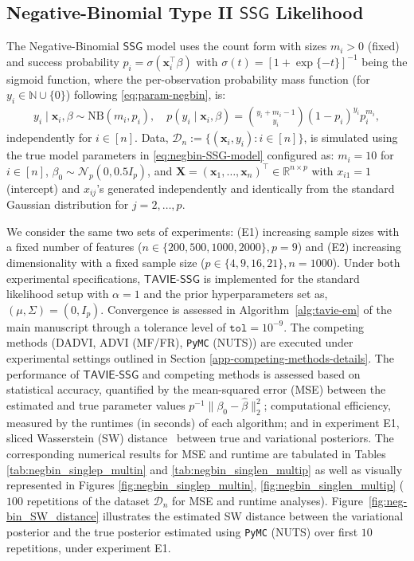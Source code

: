 \documentclass[12pt]{article}
\numberwithin{equation}{section}
\newcommand{\tssg}{\mathsf{TAVIE}\text{-}\mathsf{SSG}}
\begin{document}
\newpage

\subsection{Negative-Binomial Type II \texorpdfstring{$\mathsf{SSG}$}{SSG} Likelihood}\label{subsec:sim-exp-negbin}
The Negative-Binomial $\mathsf{SSG}$ model uses the count form with sizes $m_i>0$ (fixed) and success probability $p_i = \sigma(\mathbf{x}_i^{\top}\beta)$ with $\sigma(t) = [1 + \exp\{-t\}]^{-1}$ being the sigmoid function, where the per-observation probability mass function (for $y_i\in \mathbb{N}\cup \{0\}$) following \eqref{eq:param-negbin}, is:
\begin{align}\label{eq:negbin-SSG-model}
    y_i\mid \mathbf{x}_i, \beta \sim \mathrm{NB}(m_i, p_i), \quad p(y_i\mid \mathbf{x}_i, \beta) = \binom{y_i+m_i-1}{y_i}(1-p_i)^{y_i}p_{i}^{m_i},
\end{align}
independently for $i\in [n]$. Data, $\mathcal{D}_n:=\{(\mathbf{x}_i, y_i): i\in [n]\}$, is simulated using the true model parameters in \eqref{eq:negbin-SSG-model} configured as: $m_i=10$ for $i\in [n]$, $\beta_0 \sim \mathcal{N}_{p}(0, 0.5 I_{p})$, and $\mathbf{X} = (\mathbf{x}_1, \ldots, \mathbf{x}_n)^{\top}\in \mathbb{R}^{n\times p}$ with $x_{i1}=1$ (intercept) and $x_{ij}$'s generated independently and identically from the standard Gaussian distribution for $j=2,\ldots, p$.

We consider the same two sets of experiments: (E1) increasing sample sizes with a fixed number of features ($n\in \{200, 500, 1000, 2000\}, p = 9$) and (E2) increasing dimensionality with a fixed sample size ($p\in \{4, 9, 16, 21\}, n = 1000$). Under both experimental specifications, $\tssg$ is implemented for the standard likelihood setup with $\alpha=1$ and the prior hyperparameters set as, $(\mu, \Sigma) = (0, I_{p})$. Convergence is assessed in Algorithm~\ref{alg:tavie-em} of the main manuscript through a tolerance level of $\texttt{tol}=10^{-9}$. The competing methods (DADVI, ADVI (MF/FR), \texttt{PyMC} (NUTS)) are executed under experimental settings outlined in Section \ref{app-competing-methods-details}. The performance of $\tssg$ and competing methods is assessed based on statistical accuracy, quantified by the mean-squared error (MSE) between the estimated and true parameter values $p^{-1}\lVert \beta_0 - \widehat{\beta}\rVert_{2}^{2}$; computational efficiency, measured by the runtimes (in seconds) of each algorithm; and in experiment E1, sliced Wasserstein (SW) distance~\citep{bonneel2015sliced,kolouri2016sliced} between true and variational posteriors. The corresponding numerical results for MSE and runtime are tabulated in Tables \ref{tab:negbin_singlep_multin} and \ref{tab:negbin_singlen_multip} as well as visually represented in Figures \ref{fig:negbin_singlep_multin}, \ref{fig:negbin_singlen_multip} ($100$ repetitions of the dataset $\mathcal{D}_n$ for MSE and runtime analyses). Figure~\ref{fig:neg-bin_SW_distance} illustrates the estimated SW distance between the variational posterior and the true posterior estimated using \texttt{PyMC} (NUTS) over first $10$ repetitions, under experiment E1.
\end{document}
